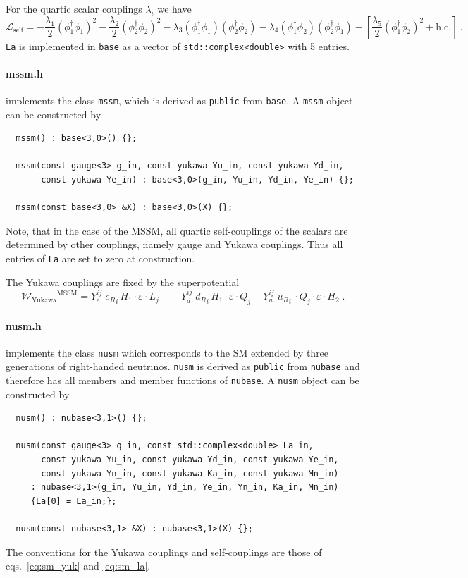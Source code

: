 \documentclass[preprint,12pt]{elsarticle}
\begin{document}
For the quartic scalar couplings $\lambda_i$ we have
\begin{equation} \label{eq:thdm_la}
  \mathcal{L}_{\mathrm{self}} = -\frac{\lambda_1}{2} (\phi_1^\dagger\phi_1)^2 -\frac{\lambda_2}{2} (\phi_2^\dagger\phi_2)^2 - \lambda_3(\phi_1^\dagger\phi_1)(\phi_2^\dagger\phi_2) - \lambda_4(\phi_1^\dagger\phi_2)(\phi_2^\dagger\phi_1)
                                -\left[\frac{\lambda_5}{2} (\phi_1^\dagger\phi_2)^2 + \mathrm{h.c.}\right]~.
\end{equation}
\texttt{La} is implemented in \texttt{base} as a vector of \texttt{std::complex<double>} with 5 entries.

\paragraph{mssm.h}
implements the class \texttt{mssm}, which is derived as \texttt{public} from \texttt{base}. A \texttt{mssm} object can be constructed by
\begin{lstlisting}
  mssm() : base<3,0>() {};
 
  mssm(const gauge<3> g_in, const yukawa Yu_in, const yukawa Yd_in,
       const yukawa Ye_in) : base<3,0>(g_in, Yu_in, Yd_in, Ye_in) {};
 
  mssm(const base<3,0> &X) : base<3,0>(X) {};
\end{lstlisting}
Note, that in the case of the MSSM, all quartic self-couplings of the scalars are determined by other couplings, namely gauge and Yukawa couplings.
Thus all entries of \texttt{La} are set to zero at construction.

The Yukawa couplings are fixed by the superpotential
\begin{equation} \label{eq:mssm_yuk}
  \mathcal{W_\mathrm{Yukawa}}^{\mathrm{MSSM}} = Y_e^{ij} \; {e_R}_i\, H_1\cdot \varepsilon \cdot L_j \quad + Y_d^{ij} \; {d_R}_i \, H_1\cdot \varepsilon \cdot Q_j + Y_u^{ij} \; {u_R}_i \, \cdot Q_j\cdot \varepsilon \cdot H_2 \;.
\end{equation} 

\paragraph{nusm.h}
implements the class \texttt{nusm} which corresponds to the SM extended by three generations of right-handed neutrinos.
\texttt{nusm} is derived as \texttt{public} from \texttt{nubase} and therefore has all members and member functions of \texttt{nubase}. A \texttt{nusm} object can be constructed by
\begin{lstlisting}
  nusm() : nubase<3,1>() {};
 
  nusm(const gauge<3> g_in, const std::complex<double> La_in,
       const yukawa Yu_in, const yukawa Yd_in, const yukawa Ye_in,
       const yukawa Yn_in, const yukawa Ka_in, const yukawa Mn_in)
     : nubase<3,1>(g_in, Yu_in, Yd_in, Ye_in, Yn_in, Ka_in, Mn_in)
     {La[0] = La_in;};
  
  nusm(const nubase<3,1> &X) : nubase<3,1>(X) {};
\end{lstlisting}
The conventions for the Yukawa couplings and self-couplings are those of eqs.~\eqref{eq:sm_yuk} and \eqref{eq:sm_la}.
\end{document}
